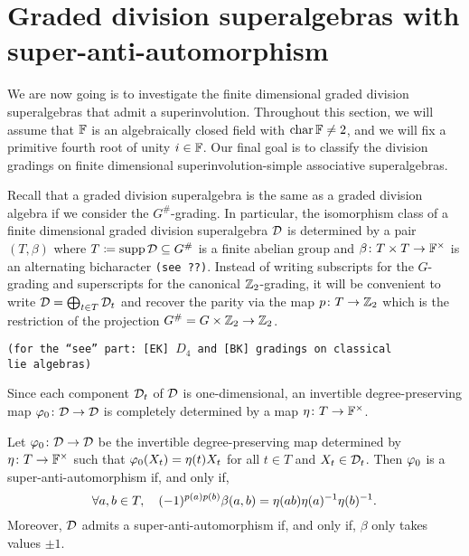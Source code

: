 
\section{Graded division superalgebras with super-anti-automorphism}

We are now going is to investigate the finite dimensional graded division superalgebras that admit a superinvolution. 
Throughout this section, we will assume that $\mathbb{F}$ is an algebraically closed field with $\operatorname{char} \mathbb{F} \neq 2$, and we will fix a primitive fourth root of unity $i \in \mathbb{F}$.
Our final goal is to classify the division gradings on finite dimensional superinvolution-simple associative superalgebras.
 
Recall that a graded division superalgebra is the same as a graded division algebra if we consider the $G^\#$-grading. 
In particular, the isomorphism class of a finite dimensional graded division superalgebra $\mathcal{D}$ is determined by a pair $(T, \beta)$ where $T \coloneqq \operatorname{supp} \mathcal{D} \subseteq G^\#$ is a finite abelian group and $\beta\colon T\times T \to \mathbb{F}^\times$ is an alternating bicharacter {\tt (see ??)}. 
Instead of writing subscripts for the $G$-grading and superscripts for the canonical $\mathbb{Z}_2$-grading, it will be convenient to write $\mathcal{D} = \bigoplus_{t\in T} \mathcal{D}_t$ and recover the parity via the map $p\colon T \to \mathbb{Z}_2$ which is the restriction of the projection $G^\# = G\times \mathbb{Z}_2 \to \mathbb{Z}_2$. 

{\tt (for the ``see'' part: [EK] $D_4$ and [BK] gradings on classical \\lie algebras)}

Since each component $\mathcal{D}_t$ of $\mathcal{D}$ is one-dimensional, an invertible degree-preserving map $\varphi_0\colon \mathcal{D} \to \mathcal{D}$ is completely determined by a map $\eta\colon T \to \mathbb{F}^\times$.

\begin{prop}\label{prop:superpolarization}
    Let $\varphi_0\colon \mathcal{D} \to \mathcal{D}$ be the invertible degree-preserving map determined by $\eta\colon T \to \mathbb{F}^\times$  such that $\varphi_0(X_t) = \eta(t) X_t$ for all $t\in T$ and $X_t\in \mathcal{D}_t$. 
    Then $\varphi_0$ is a super-anti-automorphism if, and only if,
    \begin{equation}\label{eq:superpolarization}
        \forall a,b\in T, \quad (-1)^{p(a) p(b)} \beta(a,b) =  \eta(ab) \eta(a)^{-1} \eta(b)^{-1}.
    \end{equation}
    Moreover, $\mathcal{D}$ admits a super-anti-automorphism if, and only if, $\beta$ only takes values $\pm 1$.
\end{prop}


